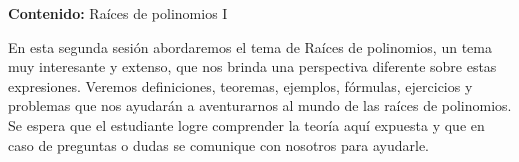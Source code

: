 {\Large
    \textbf{Contenido:} Raíces de polinomios I
}

En esta segunda sesión abordaremos el tema de Raíces de polinomios, un tema muy interesante y extenso, que nos brinda una
perspectiva diferente sobre estas expresiones. Veremos definiciones, teoremas, ejemplos, fórmulas, ejercicios y problemas
que nos ayudarán a aventurarnos al mundo de las raíces de polinomios. Se espera que el estudiante logre comprender la teoría
aquí expuesta y que en caso de preguntas o dudas se comunique con nosotros para ayudarle.